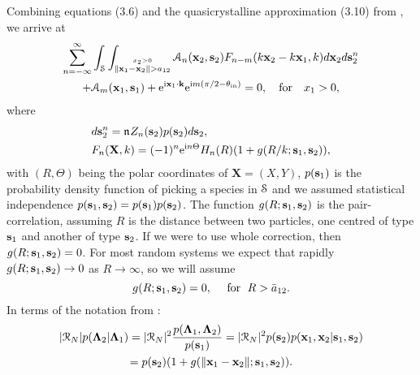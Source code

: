 \documentclass[12pt, a4paper]{article}
\begin{document}
Combining equations (3.6) and the quasicrystalline approximation (3.10) from \parencite{gower_reflection_2018}, we arrive at
\begin{multline}
 \sum_{n=-\infty}^\infty \int_\mathcal S \int_{\stackrel{x_2 > 0 }{\|\mathbf x_1 - \mathbf x_2 \| > a_{12}}}  \mathcal A_n (\mathbf x_2, \mathbf s_2) F_{n-m}(k\mathbf x_2 - k \mathbf x_1,k)  d \mathbf x_2 d\mathbf s_2^n
\\
+  \mathcal A_m (\mathbf x_1, \mathbf s_1) + \textrm{e}^{\textrm{i} \mathbf x_1 \cdot \mathbf k } \textrm{e}^{\textrm{i} m ( \pi/2 - \theta_{\mathrm{in}} )}
   = 0, \quad \text{for} \quad x_1 >0,
  \label{eqn:ensemAsystem}
\end{multline}
where
\begin{align}
  & d\mathbf s_2^n = \mathfrak n_{} Z_n (\mathbf s_2) p(\mathbf s_2) d\mathbf s_2,
  \\
  & F_{n}(\mathbf X,k) = (-1)^{n}\textrm{e}^{\textrm{i} n \Theta} H_{n}(R)( 1 + g(R/k;  \mathbf s_1,\mathbf s_2)),
  \label{eqn:integral_kernel}
\end{align}
with $(R,\Theta)$ being the polar coordinates of $\mathbf X = (X,Y)$,
$p(\mathbf s_1)$ is the probability density function of picking a species in $\mathcal S$ and we assumed statistical independence $p(\mathbf s_1, \mathbf s_2) = p(\mathbf s_1)p(\mathbf s_2)$. The function $g(R; \mathbf s_1,\mathbf s_2)$ is the pair-correlation, assuming $R$ is the distance between two particles, one centred of type $\mathbf s_1$ and another of type $\mathbf s_2$. If we were to use whole correction, then $g(R; \mathbf s_1,\mathbf s_2) = 0$.
For most random systems we expect that rapidly $g(R; \mathbf s_1,\mathbf s_2) \to 0$ as $R \to \infty$, so we will assume
\begin{equation}
  g(R; \mathbf s_1,\mathbf s_2) = 0, \quad \text{ for } \; R > \bar a_{12}.
  \label{eqn:pair_correlation}
\end{equation}
In terms of the notation from \parencite{gower_reflection_2018}:
\begin{multline}
  |\mathcal R_N| p(\boldsymbol{\Lambda}_{2} | \boldsymbol{\Lambda}_{1}) = |\mathcal R_N|^2 \frac{p(\boldsymbol{\Lambda}_{1}, \boldsymbol{\Lambda}_{2})}{p(\mathbf s_1)} = |\mathcal R_N|^2 p(\mathbf s_2) p(\mathbf x_1, \mathbf x_2 | \mathbf s_1,\mathbf s_2)
  \\ = p(\mathbf s_2)(1 + g(\|\mathbf x_1 - \mathbf x_2\|;  \mathbf s_1,\mathbf s_2)).
\end{multline}
\end{document}
